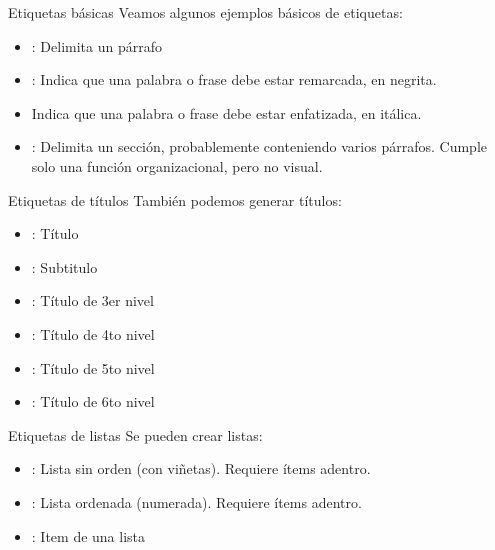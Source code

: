 \begin{frame}{Etiquetas básicas}
	Veamos algunos ejemplos básicos de etiquetas:
	\begin{itemize}
		\item {}: Delimita un párrafo
		\item {}: Indica que una palabra o frase debe estar remarcada,
			en negrita.
		\item {} Indica que una palabra o frase debe estar enfatizada, en
			itálica.
		\item {}: Delimita un sección, probablemente conteniendo varios párrafos.
			Cumple solo una función organizacional, pero no visual.
	\end{itemize}
\end{frame}


\begin{frame}{Etiquetas de títulos}
	También podemos generar títulos:
	\begin{itemize}
		\item {}: Título
		\item {}: Subtitulo
		\item {}: Título de 3er nivel
		\item {}: Título de 4to nivel
		\item {}: Título de 5to nivel
		\item {}: Título de 6to nivel
	\end{itemize}
\end{frame}


\begin{frame}{Etiquetas de listas}
	Se pueden crear listas:
	\begin{itemize}
		\item {}: Lista sin orden (con viñetas). Requiere ítems adentro.
		\item {}: Lista ordenada (numerada). Requiere ítems adentro.
		\item {}: Item de una lista
	\end{itemize}
\end{frame}


